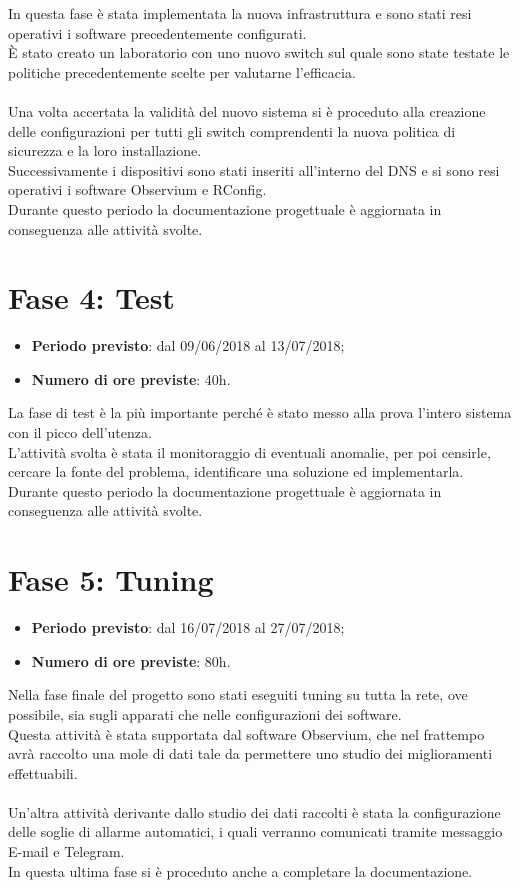 \documentclass[Tesi.tex]{subfiles}
\begin{document}
In questa fase è stata implementata la nuova infrastruttura e sono stati resi operativi i software precedentemente configurati. \\
\`{E} stato creato un laboratorio con uno nuovo switch sul quale sono state testate le politiche precedentemente scelte per valutarne l'efficacia.\\\\
Una volta accertata la validità del nuovo sistema si è proceduto alla creazione delle configurazioni per tutti gli switch comprendenti la nuova politica di sicurezza e la loro installazione. \\
Successivamente i dispositivi sono stati inseriti all'interno del DNS e si sono resi operativi i software Observium e RConfig. \\
Durante questo periodo la documentazione progettuale è aggiornata in conseguenza alle attività svolte.


\section{Fase 4: Test}
\begin{itemize}
	\item \textbf{Periodo previsto}: dal 09/06/2018 al 13/07/2018;
	\item \textbf{Numero di ore previste}: 40h.
\end{itemize}
	
La fase di test è la più importante perché è stato messo alla prova l'intero sistema con il picco dell'utenza. \\
L'attività svolta è stata il monitoraggio di eventuali anomalie, per poi censirle, cercare la fonte del problema, identificare una soluzione ed implementarla. \\
Durante questo periodo la documentazione progettuale è aggiornata in conseguenza alle attività svolte.

	

\section{Fase 5: Tuning}
\begin{itemize}
	\item \textbf{Periodo previsto}: dal 16/07/2018 al 27/07/2018;
	\item \textbf{Numero di ore previste}: 80h.
\end{itemize}
	
Nella fase finale del progetto sono stati eseguiti tuning su tutta la rete, ove possibile, sia sugli apparati che nelle configurazioni dei software. \\
Questa attività è stata supportata dal software Observium, che nel frattempo avrà raccolto una mole di dati tale da permettere uno studio dei miglioramenti effettuabili.\\\\
Un'altra attività derivante dallo studio dei dati raccolti è stata la configurazione delle soglie di allarme automatici, i quali verranno comunicati tramite messaggio E-mail e Telegram. \\
In questa ultima fase si è proceduto anche a completare la documentazione. 
\end{document}
